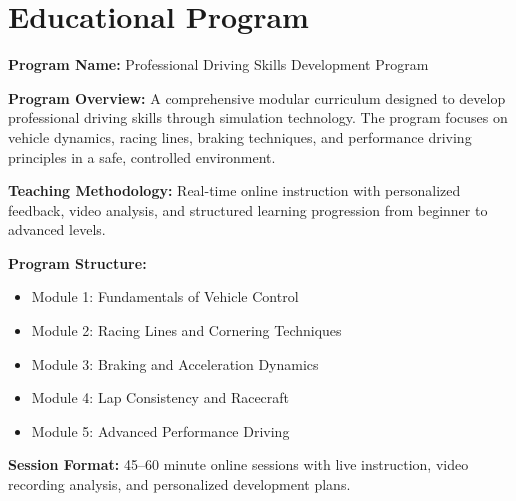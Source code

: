 \documentclass[12pt]{article}
\begin{document}
{\begin{minipage}[c][250mm]{170mm}
\begin{minipage}{\textwidth}
\section*{Educational Program}
\noindent\textbf{Program Name:} Professional Driving Skills Development Program\par
\vspace{5pt}
\noindent\textbf{Program Overview:} A comprehensive modular curriculum designed to develop professional driving skills through simulation technology. The program focuses on vehicle dynamics, racing lines, braking techniques, and performance driving principles in a safe, controlled environment.\par
\vspace{5pt}
\noindent\textbf{Teaching Methodology:} Real-time online instruction with personalized feedback, video analysis, and structured learning progression from beginner to advanced levels.\par
\vspace{5pt}
\noindent\textbf{Program Structure:}\par
\begin{itemize}[leftmargin=*,noitemsep]
  \item Module 1: Fundamentals of Vehicle Control
  \item Module 2: Racing Lines and Cornering Techniques
  \item Module 3: Braking and Acceleration Dynamics
  \item Module 4: Lap Consistency and Racecraft
  \item Module 5: Advanced Performance Driving
\end{itemize}
\noindent\textbf{Session Format:} 45–60 minute online sessions with live instruction, video recording analysis, and personalized development plans.\par
\vspace{15pt}


\end{minipage}
\end{minipage}}
\end{document}
